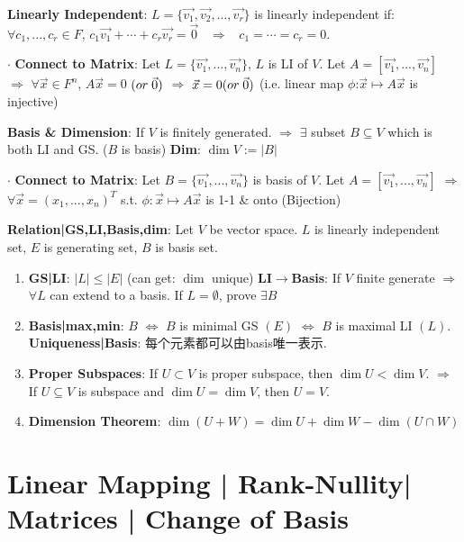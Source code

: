 \documentclass[9pt]{article}
\begin{document}
\textbf{Linearly Independent}: $L=\{\vec{v_1},\vec{v_2},...,\vec{v_r}\}$ is linearly independent if: \ $\forall c_1,...,c_r\in F$, $c_1\vec{v_1}+\cdots+c_r\vec{v_r}=\vec{0}$ \ $\Rightarrow$ \ $c_1=\cdots =c_r=0$.

$\cdot$ \textbf{Connect to Matrix}: {\footnotesize Let $L=\{\vec{v_1},...,\vec{v_n}\}$, $L$ is LI of $V$. Let $A=[\vec{v_1},...,\vec{v_n}]$ $\Rightarrow$ $\forall\vec{x}\in F^n$, $A\vec{x}=0$ ${\scriptsize (or \ \vec{0})}$ $\Rightarrow$ $\vec{x}=0 {\scriptsize (or \ \vec{0})}$ (i.e. linear map $\phi$:$\vec{x}\mapsto A\vec{x}$ is injective)}

\textbf{Basis \& Dimension}: If $V$ is finitely generated. $\Rightarrow$ $\exists$ subset $B\subseteq V$ which is both LI and GS. ($B$ is basis) \quad \textbf{Dim}: $\dim V:=|B|$

$\cdot$ \textbf{Connect to Matrix}: {\footnotesize Let $B=\{\vec{v_1},...,\vec{v_n}\}$ is basis of $V$. Let $A=[\vec{v_1},...,\vec{v_n}]$ $\Rightarrow$ $\forall\vec{x}=(x_1,...,x_n)^T$ s.t. $\phi:\vec{x}\mapsto A\vec{x}$ is 1-1 \& onto (Bijection)}

\textbf{Relation|GS,LI,Basis,dim}: {\small Let $V$ be vector space. $L$ is linearly independent set, $E$ is generating set, $B$ is basis set.}

\begin{enumerate}[itemsep=-2pt, topsep=-2pt]
    \item \textbf{GS|LI}: $|L|\leq|E|$ {\scriptsize (can get: $\dim$ unique)} \quad \textbf{LI$\to$Basis}: If $V$ finite generate $\Rightarrow$ $\forall L$ can extend to a basis. {\scriptsize If $L=\emptyset$, prove $\exists B$}
    \item \textbf{Basis|max,min}: $B$ $\Leftrightarrow$ $B$ is minimal GS $(E)$ $\Leftrightarrow$ $B$ is maximal LI $(L)$. \quad \textbf{Uniqueness|Basis}: {\small 每个元素都可以由basis唯一表示.}
    \item \textbf{Proper Subspaces}: {\small If $U\subset V$ is proper subspace, then $\dim U<\dim V$. \quad $\Rightarrow$ \quad If $U\subseteq V$ is subspace and $\dim U=\dim V$, then $U=V$.}
    \item \textbf{Dimension Theorem}: $\dim(U+W)=\dim U+\dim W-\dim(U\cap W)$
\end{enumerate}


\section{Linear Mapping | Rank-Nullity| Matrices | Change of Basis }
\end{document}
